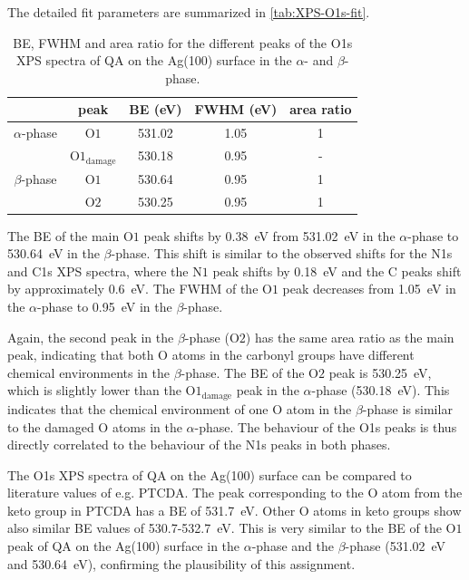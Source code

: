 The detailed fit parameters are summarized in \autoref{tab:XPS-O1s-fit}.

\begin{table}[H]
	\centering
	\caption{\Ac{BE}, \ac{FWHM} and area ratio for the different peaks of the O1s \ac{XPS} spectra of \ac{QA} on the Ag(100) surface in the $\alpha$- and $\beta$-phase.}
	\begin{tabular}{@{}ccccc@{}} \toprule
		 & peak & \ac{BE} (eV) & \ac{FWHM} (eV) & area ratio \\
		\midrule
		$\alpha$-phase & $\mathrm{O1}$ & 531.02 & 1.05 & 1 \\
		& $\mathrm{O1_{damage}}$ & 530.18 & 0.95 & - \\
        \midrule
		$\beta$-phase & $\mathrm{O1}$ & 530.64 & 0.95 & 1 \\
		& $\mathrm{O2}$ & 530.25 & 0.95 & 1 \\
		\bottomrule
	\end{tabular}
	\label{tab:XPS-O1s-fit}
\end{table}

The \ac{BE} of the main $\mathrm{O1}$ peak shifts by 0.38~\si{eV} from 531.02~\si{eV} in the $\alpha$-phase to 530.64~\si{eV} in the $\beta$-phase. This shift is similar to the observed shifts for the N1s and C1s \ac{XPS} spectra, where the $\mathrm{N1}$ peak shifts by 0.18~\si{eV} and the C peaks shift by approximately 0.6~\si{eV}. The \ac{FWHM} of the $\mathrm{O1}$ peak decreases from 1.05~\si{eV} in the $\alpha$-phase to 0.95~\si{eV} in the $\beta$-phase. 

Again, the second peak in the $\beta$-phase ($\mathrm{O2}$) has the same area ratio as the main peak, indicating that both O atoms in the carbonyl groups have different chemical environments in the $\beta$-phase. The \ac{BE} of the $\mathrm{O2}$ peak is 530.25~\si{eV}, which is slightly lower than the $\mathrm{O1_{damage}}$ peak in the $\alpha$-phase (530.18~\si{eV}). This indicates that the chemical environment of one O atom in the $\beta$-phase is similar to the damaged O atoms in the $\alpha$-phase. The behaviour of the O1s peaks is thus directly correlated to the behaviour of the N1s peaks in both phases.

The O1s \ac{XPS} spectra of \ac{QA} on the Ag(100) surface can be compared to literature values of e.g. \ac{PTCDA}. The peak corresponding to the O atom from the keto group in \ac{PTCDA} has a \ac{BE} of 531.7~\si{eV}.\autocite{Bauer2014} Other O atoms in keto groups show also similar \ac{BE} values of 530.7-532.7~\si{eV}.\autocite{Lopez1991,Sparks1997,Schwaner1997} This is very similar to the \ac{BE} of the $\mathrm{O1}$ peak of \ac{QA} on the Ag(100) surface in the $\alpha$-phase and the $\beta$-phase (531.02~\si{eV} and 530.64~\si{eV}), confirming the plausibility of this assignment.


